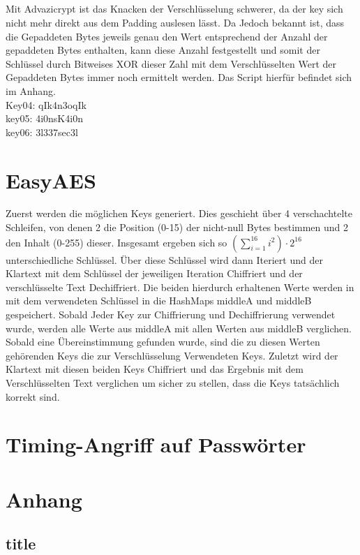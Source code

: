 \documentclass[12pt]{article}
\theoremstyle{plain}
\begin{document}
\subsection{}
Mit Advazicrypt ist das Knacken der Verschlüsselung schwerer, da der key sich nicht mehr direkt aus dem Padding auslesen lässt. Da Jedoch bekannt ist, dass die Gepaddeten Bytes jeweils genau den Wert entsprechend der Anzahl der gepaddeten Bytes enthalten, kann diese Anzahl festgestellt und somit der Schlüssel durch Bitweises XOR dieser Zahl mit dem Verschlüsselten Wert der Gepaddeten Bytes immer noch ermittelt werden. Das Script hierfür befindet sich im Anhang.\\
Key04: qIk4n3oqIk\\
key05: 4i0nsK4i0n\\
key06: 3l337sec3l\\
\section{EasyAES}
Zuerst werden die möglichen Keys generiert. Dies geschieht über 4 verschachtelte Schleifen, von denen 2 die Position (0-15) der nicht-null Bytes bestimmen und 2 den Inhalt (0-255) dieser. Insgesamt ergeben sich so $(\sum_{i=1}^{16} i^2)\cdot 2^{16}$ unterschiedliche Schlüssel. Über diese Schlüssel wird dann Iteriert und der Klartext mit dem Schlüssel der jeweiligen Iteration Chiffriert und der verschlüsselte Text Dechiffriert. Die beiden hierdurch erhaltenen Werte werden in mit dem verwendeten Schlüssel in die HashMaps middleA und middleB gespeichert. Sobald Jeder Key zur Chiffrierung und Dechiffrierung verwendet wurde, werden alle Werte aus middleA mit allen Werten aus middleB verglichen. Sobald eine Übereinstimmung gefunden wurde, sind die zu diesen Werten gehörenden Keys die zur Verschlüsselung Verwendeten Keys. Zuletzt wird der Klartext mit diesen beiden Keys Chiffriert und das Ergebnis mit dem Verschlüsselten Text verglichen um sicher zu stellen, dass die Keys tatsächlich korrekt sind.
\section{Timing-Angriff auf Passwörter}
\section{Anhang}
\subsection{title}
\end{document}
